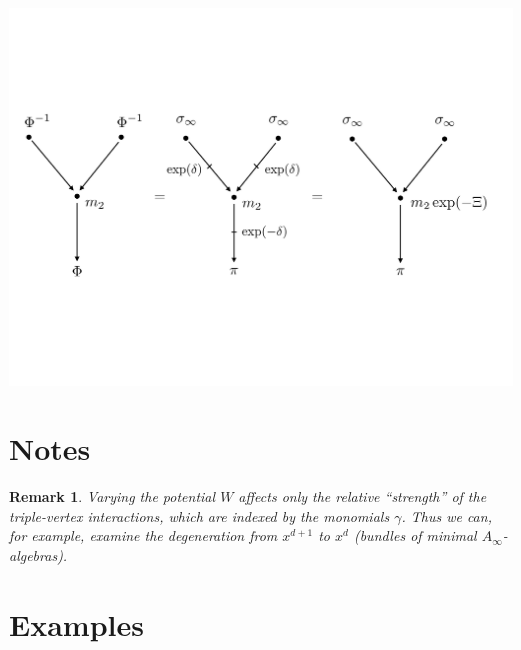 \documentclass[english,letter paper,12pt,leqno]{article}
\theoremstyle{example}
\newtheorem{remark}[theorem]{Remark}
\numberwithin{equation}{section}
\begin{document}
\begin{center}
\includegraphics[scale=0.35]{diagram-2}
\end{center}

\section{Notes}

\begin{remark} Varying the potential $W$ affects only the relative ``strength'' of the triple-vertex interactions, which are indexed by the monomials $\gamma$. Thus we can, for example, examine the degeneration from $x^{d+1}$ to $x^d$ (bundles of minimal $A_\infty$-algebras).
\end{remark}

\section{Examples}
\end{document}
